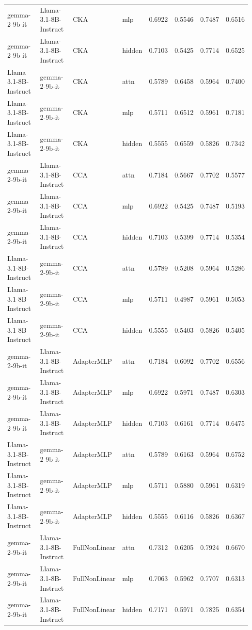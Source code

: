 {\begin{tabularx}{\textwidth}{XXXlcccc}
gemma-2-9b-it & Llama-3.1-8B-Instruct & CKA & mlp & 0.6922 & 0.5546 & 0.7487 & 0.6516 \\
gemma-2-9b-it & Llama-3.1-8B-Instruct & CKA & hidden & 0.7103 & 0.5425 & 0.7714 & 0.6525 \\
Llama-3.1-8B-Instruct & gemma-2-9b-it & CKA & attn & 0.5789 & 0.6458 & 0.5964 & 0.7400 \\
Llama-3.1-8B-Instruct & gemma-2-9b-it & CKA & mlp & 0.5711 & 0.6512 & 0.5961 & 0.7181 \\
Llama-3.1-8B-Instruct & gemma-2-9b-it & CKA & hidden & 0.5555 & 0.6559 & 0.5826 & 0.7342 \\
\midrule
gemma-2-9b-it & Llama-3.1-8B-Instruct & CCA & attn & 0.7184 & 0.5667 & 0.7702 & 0.5577 \\
gemma-2-9b-it & Llama-3.1-8B-Instruct & CCA & mlp & 0.6922 & 0.5425 & 0.7487 & 0.5193 \\
gemma-2-9b-it & Llama-3.1-8B-Instruct & CCA & hidden & 0.7103 & 0.5399 & 0.7714 & 0.5354 \\
Llama-3.1-8B-Instruct & gemma-2-9b-it & CCA & attn & 0.5789 & 0.5208 & 0.5964 & 0.5286 \\
Llama-3.1-8B-Instruct & gemma-2-9b-it & CCA & mlp & 0.5711 & 0.4987 & 0.5961 & 0.5053 \\
Llama-3.1-8B-Instruct & gemma-2-9b-it & CCA & hidden & 0.5555 & 0.5403 & 0.5826 & 0.5405 \\
\midrule
gemma-2-9b-it & Llama-3.1-8B-Instruct & AdapterMLP & attn & 0.7184 & 0.6092 & 0.7702 & 0.6556 \\
gemma-2-9b-it & Llama-3.1-8B-Instruct & AdapterMLP & mlp & 0.6922 & 0.5971 & 0.7487 & 0.6303 \\
gemma-2-9b-it & Llama-3.1-8B-Instruct & AdapterMLP & hidden & 0.7103 & 0.6161 & 0.7714 & 0.6475 \\
Llama-3.1-8B-Instruct & gemma-2-9b-it & AdapterMLP & attn & 0.5789 & 0.6163 & 0.5964 & 0.6752 \\
Llama-3.1-8B-Instruct & gemma-2-9b-it & AdapterMLP & mlp & 0.5711 & 0.5880 & 0.5961 & 0.6319 \\
Llama-3.1-8B-Instruct & gemma-2-9b-it & AdapterMLP & hidden & 0.5555 & 0.6116 & 0.5826 & 0.6367 \\
\midrule
gemma-2-9b-it & Llama-3.1-8B-Instruct & FullNonLinear & attn & 0.7312 & 0.6205 & 0.7924 & 0.6670 \\
gemma-2-9b-it & Llama-3.1-8B-Instruct & FullNonLinear & mlp & 0.7063 & 0.5962 & 0.7707 & 0.6313 \\
gemma-2-9b-it & Llama-3.1-8B-Instruct & FullNonLinear & hidden & 0.7171 & 0.5971 & 0.7825 & 0.6354 \\

\end{tabularx}}
